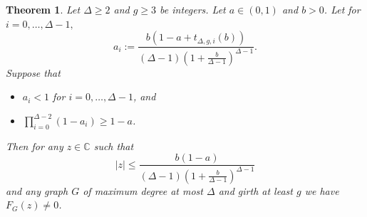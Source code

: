 \documentclass[a4paper,11pt,reqno]{amsart}
\newtheorem{theorem}[corollary]{Theorem}
\numberwithin{equation}{section}
\begin{document}
\begin{theorem}\label{thm:main general}
Let $\Delta\geq 2$ and $g\geq 3$ be integers. 
Let $a\in (0,1)$ and $b>0$. 
Let for $i=0,\ldots,\Delta-1,$
\begin{equation}\label{eq:define a_i}
    a_i:=\frac{b\left(1-a+ t_{\Delta,g,i}(b)\right)}{(\Delta-1) \left(1+\tfrac{b}{\Delta-1}\right)^{\Delta-1}}.
\end{equation}
Suppose that
\begin{itemize}
    \item $a_i<1$ for $i=0,\ldots,\Delta-1$, and
    \item $\prod_{i=0}^{\Delta-2}(1-a_i)\geq 1-a$.
\end{itemize}
Then for any $z\in \mathbb{C}$ such that 
\[|z|\leq \frac{b(1-a)}{(\Delta-1)(1+\tfrac{b}{\Delta-1})^{\Delta-1}}\]
and any graph $G$ of maximum degree at most $\Delta$ and girth at least $g$ we have $F_G(z)\neq 0$.
\end{theorem}
\end{document}
